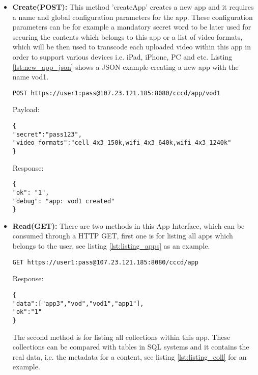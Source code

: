 \begin{itemize}
\item \textbf{Create(POST):} This method 'createApp' creates a new app and it requires a name and global configuration parameters for the app. These configuration parameters can be for example a mandatory secret word to be later used for securing the contents which belongs to this app or a list of video formats, which will be then used to transcode each uploaded video within this app in order to support various devices i.e. iPad, iPhone, PC and etc. Listing \ref{lst:new_app_json} shows a JSON example creating a new app with the name vod1.

\begin{code}
\begin{verbatim}
POST https://user1:pass@107.23.121.185:8080/cccd/app/vod1
\end{verbatim}
Payload:
\begin{verbatim}
{
"secret":"pass123",
"video_formats":"cell_4x3_150k,wifi_4x3_640k,wifi_4x3_1240k"
}
\end{verbatim}
Response:
\begin{verbatim}
{
"ok": "1",
"debug": "app: vod1 created"
}
\end{verbatim}
\caption{Creating a new app}
\label{lst:new_app_json}
\end{code}

\item \textbf{Read(GET):} There are two methods in this App Interface, which can be consumed through a HTTP GET, first one is for listing all apps which belongs to the user, see listing \ref{lst:listing_apps} as an example. 

\begin{code}
\begin{verbatim}
GET https://user1:pass@107.23.121.185:8080/cccd/app
\end{verbatim}
Response:
\begin{verbatim}
{
"data":["app3","vod","vod1","app1"],
"ok":"1"
}
\end{verbatim}
\caption{Listing all apps which belong to a user}
\label{lst:listing_apps}
\end{code}

The second method is for listing all collections within this app. These collections can be compared with tables in SQL systems and it contains the real data, i.e. the metadata for a content, see listing \ref{lst:listing_coll} for an example.


\end{itemize}

